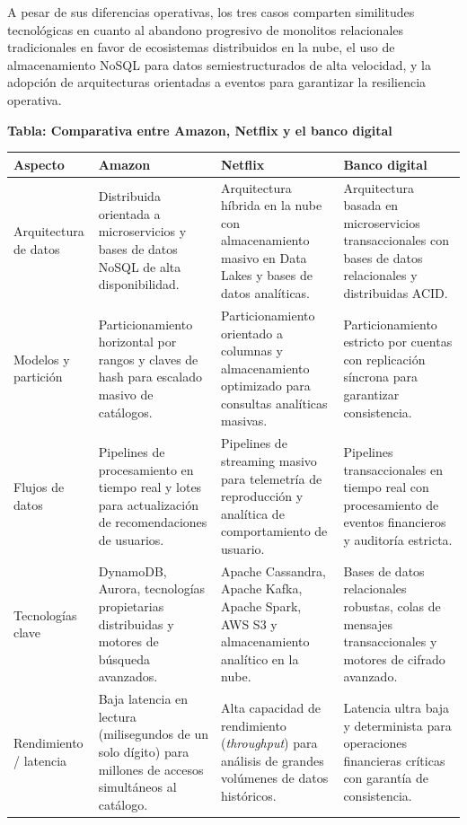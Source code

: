 \documentclass[12pt,a4paper]{article}
\begin{document}
A pesar de sus diferencias operativas, los tres casos comparten similitudes tecnológicas en cuanto al abandono progresivo de monolitos relacionales tradicionales en favor de ecosistemas distribuidos en la nube, el uso de almacenamiento NoSQL para datos semiestructurados de alta velocidad, y la adopción de arquitecturas orientadas a eventos para garantizar la resiliencia operativa.

\vspace{0.3cm}

\begin{center}
\scriptsize
\textbf{Tabla: Comparativa entre Amazon, Netflix y el banco digital}\par
\vspace{0.2cm}
\begin{tabular}{@{}L{2.3cm} L{3.4cm} L{3.4cm} L{3.4cm}@{}}
\toprule
\textbf{Aspecto} & \textbf{Amazon} & \textbf{Netflix} & \textbf{Banco digital} \\
\midrule
Arquitectura de datos & Distribuida orientada a microservicios y bases de datos NoSQL de alta disponibilidad. & Arquitectura híbrida en la nube con almacenamiento masivo en Data Lakes y bases de datos analíticas. & Arquitectura basada en microservicios transaccionales con bases de datos relacionales y distribuidas ACID. \\
\addlinespace
Modelos y partición & Particionamiento horizontal por rangos y claves de hash para escalado masivo de catálogos. & Particionamiento orientado a columnas y almacenamiento optimizado para consultas analíticas masivas. & Particionamiento estricto por cuentas con replicación síncrona para garantizar consistencia. \\
\addlinespace
Flujos de datos & Pipelines de procesamiento en tiempo real y lotes para actualización de recomendaciones de usuarios. & Pipelines de streaming masivo para telemetría de reproducción y analítica de comportamiento de usuario. & Pipelines transaccionales en tiempo real con procesamiento de eventos financieros y auditoría estricta. \\
\addlinespace
Tecnologías clave & DynamoDB, Aurora, tecnologías propietarias distribuidas y motores de búsqueda avanzados. & Apache Cassandra, Apache Kafka, Apache Spark, AWS S3 y almacenamiento analítico en la nube. & Bases de datos relacionales robustas, colas de mensajes transaccionales y motores de cifrado avanzado. \\
\addlinespace
Rendimiento / latencia & Baja latencia en lectura (milisegundos de un solo dígito) para millones de accesos simultáneos al catálogo. & Alta capacidad de rendimiento (\textit{throughput}) para análisis de grandes volúmenes de datos históricos. & Latencia ultra baja y determinista para operaciones financieras críticas con garantía de consistencia. \\

\end{tabular}
\end{center}
\end{document}
